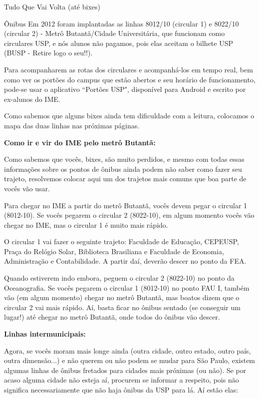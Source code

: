 \begin{secao}{Tudo Que Vai Volta (até bixes)}
\begin{subsecao}{Ônibus}
Em 2012 foram implantadas as linhas 8012/10 (circular 1) e 8022/10 (circular 2)
- Metrô Butantã/Cidade Universitária,
que funcionam como circulares USP, e nós alunos não pagamos, pois elas aceitam
o bilhete USP (BUSP - Retire logo o seu!!).

Para acompanharem as rotas dos circulares e acompanhá-los em tempo real, bem como
ver os portões do campus que estão abertos e seu horário de funcionamento, pode-se
usar o aplicativo “Portões USP", disponível para Android e escrito por ex-alunos
do IME.

Como sabemos que alguns bixes ainda tem dificuldade com a leitura, colocamos o
mapa das duas linhas nas próximas páginas.

{\bf Como ir e vir do IME pelo metrô Butantã:}

Como sabemos que vocês, bixes, são muito perdidos, e mesmo com todas essas informações
sobre os pontos de ônibus ainda podem não saber como fazer seu trajeto, resolvemos colocar
aqui um dos trajetos mais comuns que boa parte de vocês vão usar.

Para chegar no IME a partir do metrô Butantã, vocês devem pegar o circular 1 (8012-10).
Se vocês pegarem o circular 2 (8022-10), em algum momento vocês vão chegar no IME, mas
o circular 1 é muito mais rápido.

O circular 1 vai fazer o seguinte trajeto: Faculdade de Educação, CEPEUSP, Praça do Relógio
Solar, Biblioteca Brasiliana e Faculdade de Economia, Administração e Contabilidade. A partir 
daí, deverão descer no ponto da FEA.

Quando estiverem indo embora, peguem o circular 2 (8022-10) no ponto da Oceanografia. Se vocês
pegarem o circular 1 (8012-10) no ponto FAU I, também vão (em algum momento) chegar no metrô
Butantã, mas boatos dizem que o circular 2 vai mais rápido. Aí, basta ficar no ônibus sentado
(se conseguir um lugar!) até chegar no metrô Butantã, onde todos do ônibus vão descer.

{\bf Linhas intermunicipais:}

Agora, se vocês moram mais longe ainda (outra cidade, outro estado, outro país,
outra dimensão...) e não querem ou não podem se mudar para São Paulo, existem
algumas linhas de ônibus fretados para cidades mais próximas (ou não). Se por
acaso alguma cidade não esteja aí, procurem se informar a respeito, pois não significa
necessariamente que não haja ônibus da USP para lá. Aí estão elas:


\end{subsecao}
\end{secao}
